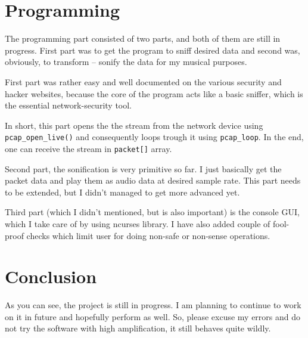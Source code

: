 \documentclass[11pt,a4paper,oneside]{article}
\begin{document}
\section{Programming}
The programming part consisted of two parts, and both of them are still in progress. First part was to get the program to sniff desired data and second was, obviously, to transform -- sonify the data for my musical purposes.

First part was rather easy and well documented on the various security and hacker websites, because the core of the program acts like a basic sniffer, which is the essential network-security tool.

In short, this part opens the the stream from the network device using  \texttt{pcap\_open\_live()} and consequently loops trough it using \texttt{pcap\_loop}. In the end, one can receive the stream in \texttt{packet[]} array. 

Second part, the sonification is very primitive so far. I just basically get the packet data and play them as audio data at desired sample rate. This part needs to be extended, but I didn't managed to get more advanced yet.

Third part (which I didn't mentioned, but is also important) is the console GUI, which I take care of by using ncurses library. I have also added couple of fool-proof checks which limit user for doing non-safe or non-sense operations.

\section{Conclusion}
As you can see, the project is still in progress. I am planning to continue to work on it in future and hopefully perform as well. So, please excuse my errors and do not try the software with high amplification, it still behaves quite wildly.
\end{document}
